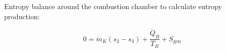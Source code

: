 Entropy balance around the combustion chamber to calculate entropy production:  

\[
0 = \dot{m}_K (s_2 - s_3) + \frac{\dot{Q}_B}{T_B} + \dot{S}_{\text{gen}}
\]